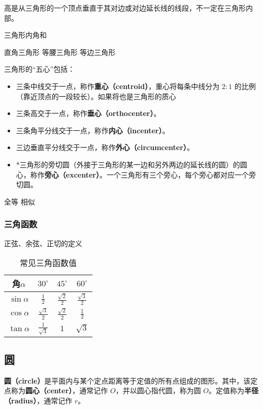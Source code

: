 高是从三角形的一个顶点垂直于其对边或对边延长线的线段，不一定在三角形内部。

三角形内角和

直角三角形
等腰三角形
等边三角形


三角形的“五心”包括：
\begin{itemize}
\item 三条中线交于一点，称作\textbf{重心（centroid）}，重心将每条中线分为 $2:1$ 的比例（靠近顶点的一段较长）。如果将也是三角形的质心
\item 三条高交于一点，称作\textbf{垂心（orthocenter）}。
\item 三条角平分线交于一点，称作\textbf{内心（incenter）}。
\item 三边垂直平分线交于一点，称作\textbf{外心（circumcenter）}。
\item *三角形的旁切圆（外接于三角形的某一边和另外两边的延长线的圆）的圆心，称作\textbf{旁心（excenter）}。一个三角形有三个旁心，每个旁心都对应一个旁切圆。
\end{itemize}

全等
相似

\subsubsection{三角函数}

正弦、余弦、正切的定义

\begin{table}[ht]
\centering
\caption{常见三角函数值}\label{tab_HsGeBa1}
\begin{tabular}{|c|c|c|c|}
\hline
角$\alpha$ & $30^{\circ}$ & $45^{\circ}$ & $60^{\circ}$ \\
\hline
$\sin\alpha$ & $\displaystyle\frac{1}{2}$ & $\displaystyle\frac{\sqrt{2}}{2}$ & $\displaystyle\frac{\sqrt{3}}{2}$ \\
\hline
$\cos\alpha$ & $\displaystyle\frac{\sqrt{3}}{2}$& $\displaystyle\frac{\sqrt{2}}{2}$ &  $\displaystyle\frac{1}{2}$ \\
\hline
$\tan\alpha$ & $\displaystyle\frac{1}{\sqrt{3}}$ & $1$ & $\sqrt{3}$ \\
\hline
\end{tabular}
\end{table}
\subsection{圆}\label{sub_HsGeBa_1}

\textbf{圆（circle）}是平面内与某个定点距离等于定值的所有点组成的图形。其中，该定点称为\textbf{圆心（center）}，通常记作 $O$，并以圆心指代圆，称为圆 $O$。定值称为\textbf{半径（radius）}，通常记作 $r$。

